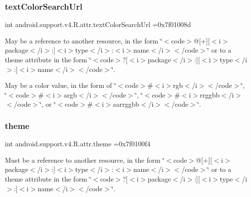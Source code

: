 \subsubsection{\texorpdfstring{text\+Color\+Search\+Url}{textColorSearchUrl}}
{\footnotesize\ttfamily int android.\+support.\+v4.\+R.\+attr.\+text\+Color\+Search\+Url =0x7f01008d\hspace{0.3cm}{\ttfamily [static]}}

May be a reference to another resource, in the form \char`\"{}$<$code$>$@\mbox{[}+\mbox{]}\mbox{[}$<$i$>$package$<$/i$>$\+:\mbox{]}$<$i$>$type$<$/i$>$\+:$<$i$>$name$<$/i$>$$<$/code$>$\char`\"{} or to a theme attribute in the form \char`\"{}$<$code$>$?\mbox{[}$<$i$>$package$<$/i$>$\+:\mbox{]}\mbox{[}$<$i$>$type$<$/i$>$\+:\mbox{]}$<$i$>$name$<$/i$>$$<$/code$>$\char`\"{}. 

May be a color value, in the form of \char`\"{}$<$code$>$\#$<$i$>$rgb$<$/i$>$$<$/code$>$\char`\"{}, \char`\"{}$<$code$>$\#$<$i$>$argb$<$/i$>$$<$/code$>$\char`\"{}, \char`\"{}$<$code$>$\#$<$i$>$rrggbb$<$/i$>$$<$/code$>$\char`\"{}, or \char`\"{}$<$code$>$\#$<$i$>$aarrggbb$<$/i$>$$<$/code$>$\char`\"{}. \mbox{\label{classandroid_1_1support_1_1v4_1_1R_1_1attr_ad29b1ce16c7b702bd1187fe041f2cda9}} 
\subsubsection{\texorpdfstring{theme}{theme}}
{\footnotesize\ttfamily int android.\+support.\+v4.\+R.\+attr.\+theme =0x7f0100f4\hspace{0.3cm}{\ttfamily [static]}}

Must be a reference to another resource, in the form \char`\"{}$<$code$>$@\mbox{[}+\mbox{]}\mbox{[}$<$i$>$package$<$/i$>$\+:\mbox{]}$<$i$>$type$<$/i$>$\+:$<$i$>$name$<$/i$>$$<$/code$>$\char`\"{} or to a theme attribute in the form \char`\"{}$<$code$>$?\mbox{[}$<$i$>$package$<$/i$>$\+:\mbox{]}\mbox{[}$<$i$>$type$<$/i$>$\+:\mbox{]}$<$i$>$name$<$/i$>$$<$/code$>$\char`\"{}. \mbox{\label{classandroid_1_1support_1_1v4_1_1R_1_1attr_a30b3c9eb3da6af56431fd47ecc8ab38e}} 
